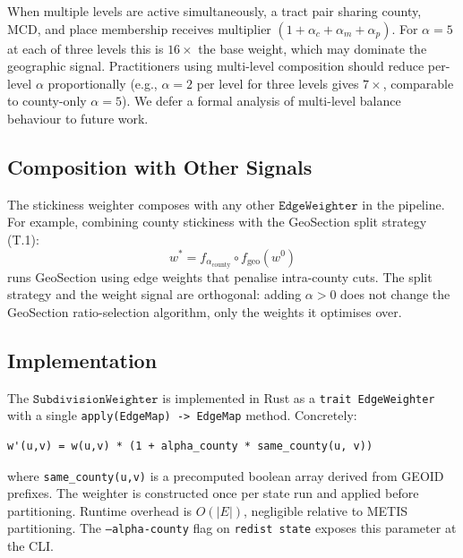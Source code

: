 \begin{remark}
When multiple levels are active simultaneously, a tract pair sharing county,
MCD, and place membership receives multiplier $(1 + \alpha_c + \alpha_m + \alpha_p)$.
For $\alpha = 5$ at each of three levels this is $16\times$ the base weight,
which may dominate the geographic signal.
Practitioners using multi-level composition should reduce per-level $\alpha$
proportionally (e.g., $\alpha = 2$ per level for three levels gives $7\times$,
comparable to county-only $\alpha = 5$).
We defer a formal analysis of multi-level balance behaviour to future work.
\end{remark}

\subsection{Composition with Other Signals}

The stickiness weighter composes with any other $\mathtt{EdgeWeighter}$ in the pipeline.
For example, combining county stickiness with the GeoSection split strategy
(T.1):
\[
  w^* = f_{\alpha_{\text{county}}} \circ f_{\text{geo}}(w^0)
\]
runs GeoSection using edge weights that penalise intra-county cuts.
The split strategy and the weight signal are orthogonal: adding $\alpha > 0$
does not change the GeoSection ratio-selection algorithm, only the weights it
optimises over.

\subsection{Implementation}

The $\mathtt{SubdivisionWeighter}$ is implemented in Rust as a \texttt{trait EdgeWeighter}
with a single \texttt{apply(EdgeMap) -> EdgeMap} method.
Concretely:
\begin{verbatim}
w'(u,v) = w(u,v) * (1 + alpha_county * same_county(u, v))
\end{verbatim}
where \texttt{same\_county(u,v)} is a precomputed boolean array derived from
GEOID prefixes.
The weighter is constructed once per state run and applied before partitioning.
Runtime overhead is $O(|E|)$, negligible relative to METIS partitioning.
The \texttt{--alpha-county} flag on \texttt{redist state} exposes this parameter
at the CLI.
